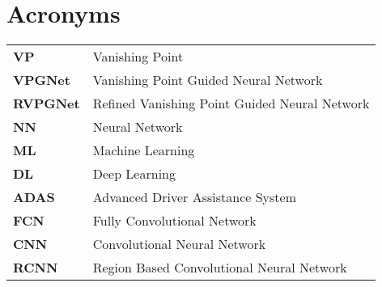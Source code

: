 \chapter*{\centering Acronyms}
\begin{spacing}{1.5}
\setlength{\parskip}{0.3in}

\begin{table}[ht]
\centering
\begin{tabular}{ll}
\textbf{VP} & Vanishing Point \\
\textbf{VPGNet} & Vanishing Point Guided Neural Network \\
\textbf{RVPGNet} & Refined Vanishing Point Guided Neural Network \\
\textbf{NN} & Neural Network \\
\textbf{ML} & Machine Learning \\
\textbf{DL} & Deep Learning \\
\textbf{ADAS} & Advanced Driver Assistance System \\
\textbf{FCN} & Fully Convolutional Network \\
\textbf{CNN} & Convolutional Neural Network \\
\textbf{RCNN} & Region Based Convolutional Neural Network
\end{tabular}%
\end{table}

\end{spacing}
\newpage
